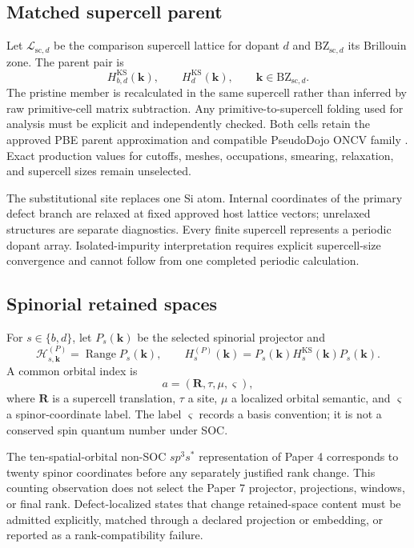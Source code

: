 \documentclass[11pt]{article}
\newenvironment{prospective}{\color{prospectivered}}{}
\begin{document}
\begin{prospective}
\subsection{Matched supercell parent}
Let $\mathcal L_{\mathrm{sc},d}$ be the comparison supercell lattice for dopant $d$ and
$\mathrm{BZ}_{\mathrm{sc},d}$ its Brillouin zone. The parent pair is
\begin{equation}
 H_{b,d}^{\mathrm{KS}}(\mathbf k),\qquad
 H_d^{\mathrm{KS}}(\mathbf k),\qquad
 \mathbf k\in\mathrm{BZ}_{\mathrm{sc},d}.
\end{equation}
The pristine member is recalculated in the same supercell rather than inferred by raw
primitive-cell matrix subtraction. Any primitive-to-supercell folding used for analysis
must be explicit and independently checked. Both cells retain the approved PBE parent
approximation and compatible PseudoDojo ONCV family
\cite{perdew1996,hamann2013,vansetten2018}. Exact production values for cutoffs, meshes,
occupations, smearing, relaxation, and supercell sizes remain unselected.

The substitutional site replaces one Si atom. Internal coordinates of the primary defect
branch are relaxed at fixed approved host lattice vectors; unrelaxed structures are
separate diagnostics. Every finite supercell represents a periodic dopant array.
Isolated-impurity interpretation requires explicit supercell-size convergence and cannot
follow from one completed periodic calculation.

\subsection{Spinorial retained spaces}
For $s\in\{b,d\}$, let $P_s(\mathbf k)$ be the selected spinorial projector and
\begin{equation}
 \mathcal H_{s,\mathbf k}^{(P)}=\operatorname{Range}P_s(\mathbf k),
 \qquad
 H_s^{(P)}(\mathbf k)=P_s(\mathbf k)H_s^{\mathrm{KS}}(\mathbf k)P_s(\mathbf k).
\end{equation}
A common orbital index is
\begin{equation}
 a=(\mathbf R,\tau,\mu,\varsigma),
\end{equation}
where $\mathbf R$ is a supercell translation, $\tau$ a site, $\mu$ a localized orbital
semantic, and $\varsigma$ a spinor-coordinate label. The label $\varsigma$ records a
basis convention; it is not a conserved spin quantum number under SOC.

The ten-spatial-orbital non-SOC $sp^3s^*$ representation of Paper 4 corresponds to
twenty spinor coordinates before any separately justified rank change. This counting
observation does not select the Paper 7 projector, projections, windows, or final rank.
Defect-localized states that change retained-space content must be admitted explicitly,
matched through a declared projection or embedding, or reported as a rank-compatibility
failure.


\end{prospective}
\end{document}
